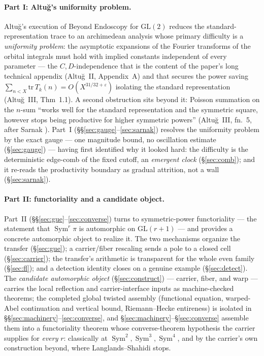 \documentclass[11pt]{article}
\theoremstyle{definition}
\newcommand{\Sym}{\operatorname{Sym}}
\begin{document}
\paragraph{Part I: Altu\u{g}'s uniformity problem.} Altu\u{g}'s execution of Beyond Endoscopy for
$\mathrm{GL}(2)$ \cite{AltI,AltII,AltIII} reduces the standard-representation trace to an archimedean
analysis whose primary difficulty is a \emph{uniformity problem}: the asymptotic expansions of the
Fourier transforms of the orbital integrals must hold with implied constants independent of every
parameter --- the $C,D$-independence that is the content of the paper's long technical appendix
(Altu\u{g}~II, Appendix~A) and that secures the power saving
$\sum_{n<X}\mathrm{tr}\,T_k(n)=O(X^{31/32+\varepsilon})$ isolating the standard representation
(Altu\u{g}~III, Thm~1.1). A second obstruction sits beyond it: Poisson summation on the $n$-sum
``works well for the standard representation and the symmetric square, however stops being productive
for higher symmetric powers'' (Altu\u{g}~III, fn.~5, after Sarnak \cite{Sar}). Part~I
(\S\S\ref{sec:gauge}--\ref{sec:sarnak}) resolves the uniformity problem by the exact gauge --- one
magnitude bound, no oscillation estimate (\S\ref{sec:gauge}) --- having first identified why it looked
hard: the difficulty is the deterministic edge-comb of the fixed cutoff, an \emph{emergent clock}
(\S\ref{sec:comb}); and it re-reads the productivity boundary as gradual attrition, not a wall
(\S\ref{sec:sarnak}).

\paragraph{Part II: functoriality and a candidate object.} Part~II
(\S\S\ref{sec:gue}--\ref{sec:converse}) turns to symmetric-power functoriality --- the statement that
$\Sym^r\pi$ is automorphic on $\mathrm{GL}(r+1)$ --- and provides a concrete automorphic object to
realize it. The two mechanisms organize the transfer (\S\ref{sec:gue}); a carrier/fiber rescaling
sends a pole to a closed cell (\S\ref{sec:carrier}); the transfer's arithmetic is transparent for the
whole even family (\S\ref{sec:fl}); and a detection identity closes on a genuine example
(\S\ref{sec:detect}). The \emph{candidate automorphic object} (\S\ref{sec:construct}) --- carrier,
fiber, and warp --- carries the local reflection and carrier-interface inputs as machine-checked theorems;
the completed global twisted assembly (functional equation, warped-Abel continuation and vertical bound,
Riemann--Hecke entireness) is isolated in \S\S\ref{sec:machinery}--\ref{sec:converse}, and
\S\ref{sec:machinery}--\S\ref{sec:converse} assemble them into a functoriality theorem whose
converse-theorem hypothesis the carrier supplies for \emph{every} $r$: classically at
$\Sym^2,\Sym^3,\Sym^4$, and by the carrier's own construction beyond, where Langlands--Shahidi stops.
\end{document}
